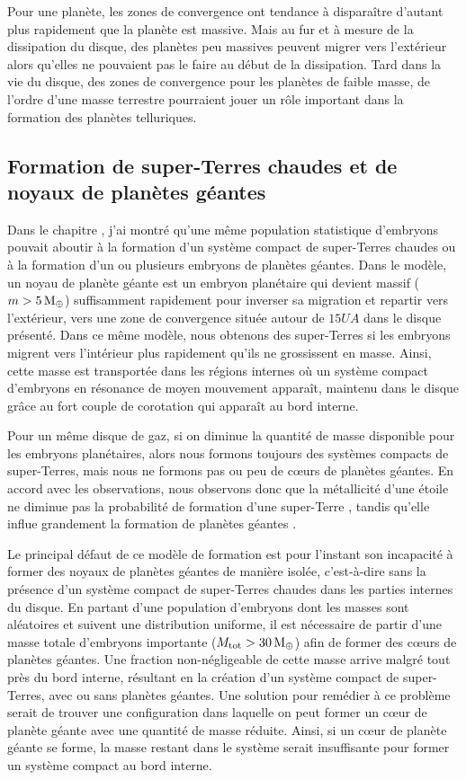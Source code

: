 Pour une planète, les zones de convergence ont tendance à disparaître d'autant plus rapidement que la planète est massive. Mais au fur et à mesure de la dissipation du disque, des planètes peu massives peuvent migrer vers l'extérieur alors qu'elles ne pouvaient pas le faire au début de la dissipation. Tard dans la vie du disque, des zones de convergence pour les planètes de faible masse, de l'ordre d'une masse terrestre pourraient jouer un rôle important dans la formation des planètes telluriques.

\subsection{Formation de super-Terres chaudes et de noyaux de planètes géantes}
Dans le chapitre , j'ai montré qu'une même population statistique d'embryons pouvait aboutir à la formation d'un système compact de super-Terres chaudes ou à la formation d'un ou plusieurs embryons de planètes géantes. Dans le modèle, un noyau de planète géante est un embryon planétaire qui devient massif ($m>5\mathrm{\thinspace M_\oplus}$) suffisamment rapidement pour inverser sa migration et repartir vers l'extérieur, vers une zone de convergence située autour de $15\unit{UA}$ dans le disque présenté. Dans ce même modèle, nous obtenons des super-Terres si les embryons migrent vers l'intérieur plus rapidement qu'ils ne grossissent en masse. Ainsi, cette masse est transportée dans les régions internes où un système compact d'embryons en résonance de moyen mouvement apparaît, maintenu dans le disque grâce au fort couple de corotation qui apparaît au bord interne.

Pour un même disque de gaz, si on diminue la quantité de masse disponible pour les embryons planétaires, alors nous formons toujours des systèmes compacts de super-Terres, mais nous ne formons pas ou peu de cœurs de planètes géantes. En accord avec les observations, nous observons donc que la métallicité d'une étoile ne diminue pas la probabilité de formation d'une super-Terre \citep{howard2012occurrence}, tandis qu'elle influe grandement la formation de planètes géantes \citep{johnson2007new}. 

\bigskip

Le principal défaut de ce modèle de formation est pour l'instant son incapacité à former des noyaux de planètes géantes de manière isolée, c'est-à-dire sans la présence d'un système compact de super-Terres chaudes dans les parties internes du disque. En partant d'une population d'embryons dont les masses sont aléatoires et suivent une distribution uniforme, il est nécessaire de partir d'une masse totale d'embryons importante ($M_\text{tot}>30\mathrm{\thinspace M_\oplus}$) afin de former des cœurs de planètes géantes. Une fraction non-négligeable de cette masse arrive malgré tout près du bord interne, résultant en la création d'un système compact de super-Terres, avec ou sans planètes géantes. Une solution pour remédier à ce problème serait de trouver une configuration dans laquelle on peut former un cœur de planète géante avec une quantité de masse réduite. Ainsi, si un cœur de planète géante se forme, la masse restant dans le système serait insuffisante pour former un système compact au bord interne. 


